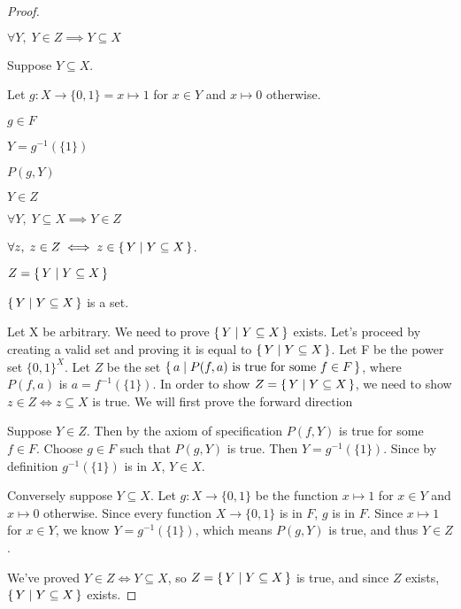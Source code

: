 \documentclass[../../main.tex]{subfiles}
\begin{document}
\begin{enumerate}
\begin{proof}
\begin{linebyline}
            \item $\forall Y, \; Y \in Z \implies Y \subseteq X$
            \item Suppose $Y \subseteq X$.
            \begin{linebyline}
                \item Let $g: X \to \{0, 1\} = x \mapsto 1$ for $x \in Y$ and $x \mapsto 0$ otherwise. 
                \item $g \in F$ 
                \item $Y = g^{-1}(\{1\})$ 
                \item $P(g, Y)$ 
                \item $Y \in Z$ 
            \end{linebyline}
            \item $\forall Y, \; Y \subseteq X \implies Y \in Z$
            \item $\forall z, \; z \in Z \iff z \in \{\,Y\mid Y \subseteq X\,\}$. 
            \item $Z = \{\,Y\mid Y \subseteq X\,\}$
            \item $\{\,Y\mid Y \subseteq X\,\}$ is a set.
        \end{linebyline}

    Let X be arbitrary. 
    We need to prove $\{\,Y\mid Y \subseteq X\,\}$ exists. 
    Let's proceed by creating a valid set and proving it is equal to $\{\,Y\mid Y \subseteq X\,\}$.
    Let F be the power set $\{0,1\}^X$. 
    Let $Z$ be the set $\Set{a}{P(f, a)$ is true for some $f \in F}$, where $P(f,a)$ is $a = f^{-1}(\{1\})$. 
    In order to show $Z=\{\,Y\mid Y \subseteq X\,\}$, we need to show $z \in Z \iff z \subseteq X$ is true.
    We will first prove the forward direction

    Suppose $Y \in Z$. 
    Then by the axiom of specification $P(f, Y)$ is true for some $f \in F$. 
    Choose $g \in F$ such that $P(g, Y)$ is true. 
    Then $Y = g^{-1}(\{1\})$.
    Since by definition $g^{-1}(\{1\})$ is in $X$, $Y \in X$.

    Conversely suppose $Y \subseteq X$.
    Let $g : X \to \{0, 1\}$ be the function $x \mapsto 1$ for $x \in Y$ and $x \mapsto 0$ otherwise. Since every function $X \to \{0, 1\}$ is in $F$, $g$ is in $F$. Since $x \mapsto 1$ for $x \in Y$, we know $Y = g^{-1}(\{1\})$, which means $P(g, Y)$ is true, and thus $Y \in Z$.

    We've proved $Y \in Z \iff Y \subseteq X$, so $Z=\{\,Y\mid Y \subseteq X\,\}$ is true, and since $Z$ exists, $\{\,Y\mid Y \subseteq X\,\}$ exists.
    \end{proof}


\end{enumerate}
\end{document}
